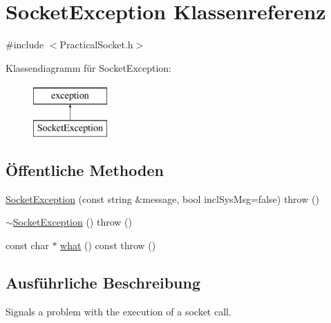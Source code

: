 \hypertarget{classSocketException}{\section{Socket\-Exception Klassenreferenz}
\label{classSocketException}
}


{\ttfamily \#include $<$Practical\-Socket.\-h$>$}

Klassendiagramm für Socket\-Exception\-:\begin{figure}[H]
\begin{center}
\leavevmode
\includegraphics[height=2.000000cm]{classSocketException}
\end{center}
\end{figure}
\subsection*{Öffentliche Methoden}
\begin{DoxyCompactItemize}
\item 
\hyperlink{classSocketException_abb5bcecd9d9e20868c237ec5a82cf5c3}{Socket\-Exception} (const string \&message, bool incl\-Sys\-Msg=false)  throw ()
\item 
\hyperlink{classSocketException_a659557c899329aea01977c980c4db9b9}{$\sim$\-Socket\-Exception} ()  throw ()
\item 
const char $\ast$ \hyperlink{classSocketException_a06b7b3f186976bb5ec7e7bf007c4f0ac}{what} () const   throw ()
\end{DoxyCompactItemize}


\subsection{Ausführliche Beschreibung}
Signals a problem with the execution of a socket call. 

